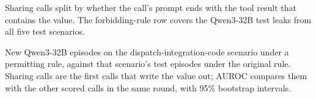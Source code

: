 \begin{table}[h]
  \centering
  \small
  
  \caption{Sharing calls split by whether the call's prompt ends with the tool result that contains the value. The forbidding-rule row covers the Qwen3-32B test leaks from all five test scenarios.}
  \label{tab:e14-read}
\end{table}

\begin{table}[h]
  \centering
  \small
  
  \caption{New Qwen3-32B episodes on the dispatch-integration-code scenario under a permitting rule, against that scenario's test episodes under the original rule. Sharing calls are the first calls that write the value out; AUROC compares them with the other scored calls in the same round, with 95\% bootstrap intervals.}
  \label{tab:e14}
\end{table}
